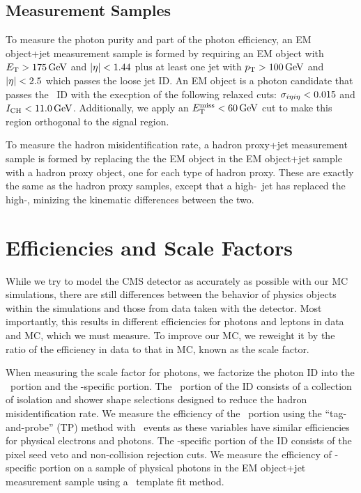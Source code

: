 \subsection{Measurement Samples}
\label{sec:measurement_samples}

To measure the photon purity and part of the photon efficiency, an EM object+jet measurement sample is formed by requiring an EM object with $E_{\mathrm{T}} > 175\,\text{Ge\hspace{-.08em}V}$ and $\lvert \eta \rvert < 1.44$ plus at least one jet with $p_{\mathrm{T}} > 100\,\text{Ge\hspace{-.08em}V}$ and $\lvert \eta \rvert < 2.5$ which passes the loose jet ID. 
An EM object is a photon candidate that passes the \egamma\ ID with the execption of the following relaxed cuts: $\sigma_{i\eta i\eta} < 0.015$ and $I_{\text{CH}} < 11.0\,\text{Ge\hspace{-.08em}V}$.
Additionally, we apply an $E_{\mathrm{T}}^{\text{miss}} < 60\,\text{Ge\hspace{-.08em}V}$ cut to make this region orthogonal to the signal region.

To measure the hadron misidentification rate, a hadron proxy+jet measurement sample is formed by replacing the the EM object in the EM object+jet sample with a hadron proxy object, one for each type of hadron proxy.
These are exactly the same as the hadron proxy samples, except that a high-\pt\ jet has replaced the high-\met, minizing the kinematic differences between the two.

\section{Efficiencies and Scale Factors}
\label{sec:photoneff}

While we try to model the CMS detector as accurately as possible with our MC simulations, there are still differences between the behavior of physics objects within the simulations and those from data taken with the detector.
Most importantly, this results in different efficiencies for photons and leptons in data and MC, which we must measure.
To improve our MC, we reweight it by the ratio of the efficiency in data to that in MC, known as the scale factor.

When measuring the scale factor for photons, we factorize the photon ID into the \egamma\ portion and the \Pgg-specific portion. 
The \egamma\ portion of the ID consists of a collection of isolation and shower shape selections designed to reduce the hadron misidentification rate.
We measure the efficiency of the \egamma\ portion  using the ``tag-and-probe'' (TP) method with \Zee\ events as these variables have similar efficiencies for physical electrons and photons. 
The \Pgg-specific portion of the ID consists of the pixel seed veto and non-collision rejection cuts.
We measure the efficiency of \Pgg-specific portion on a sample of physical photons in the EM object+jet measurement sample using a \sieie\ template fit method.

